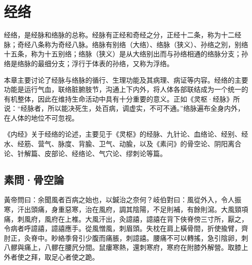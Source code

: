 \documentclass[12pt]{ctexbook}%
\begin{document}
\pagestyle{main2}
\fi
\chapter{经络}%

经络，是经脉和络脉的总称。经脉有正经和奇经之分，正经十二条，称为十二经脉；奇经八条称为奇经八脉。络脉有别络（大络）、络脉（狭义）、孙络之別，别络十五条，称为十五别络；络脉（狭义）是从大络别出而与孙络相通的络脉分支；孙络是络脉的最细分支；浮行于体表的孙络，又称为浮络。

本章主要讨论了经脉与络脉的循行、生理功能及其病理、病证等内容。经络的主要功能是运行气血，联络脏腑肢节，沟通上下内外，将人体各部联结成为一个统一的有机整体，因此在维持生命活动中具有十分重要的意义。正如《灵枢·经脉》所说：“经脉者，所以能决死生，处百病，调虚实，不可不通。”络脉遍布全身内外，在人体的地位不可忽视。

《内经》关于经络的论述，主要见于《灵枢》的经脉、九针论、血络论、经别、经水、经筋、营气、脉度、背腧、卫气、动腧，以及《素问》的骨空论、阴阳离合论、针解篇、皮部论、经络论、气穴论、缪刺论等篇。

\section{素問·骨空論}%


\begin{yuanwen}
黃帝問曰：余聞風者百病之始也，以鍼治之奈何？岐伯對曰：風從外入，令人振寒，汗出頭痛，身重惡寒，治在風府，調其陰陽，不足則補，有餘則瀉。大風頸項痛，刺風府，風府在上椎。大風汗出，灸譩譆，譩譆在背下俠脊傍三寸所，厭之，令病者呼譩譆，譩譆應手。從風憎風，刺眉頭。失枕在肩上橫骨間，折使揄臂，齊肘正，灸脊中。眇絡季脅引少腹而痛脹，刺譩譆。腰痛不可以轉搖，急引陰卵，刺八髎與痛上，八髎在腰凥分間。鼠瘻寒熱，還刺寒府，寒府在附膝外解營。取膝上外者使之拜，取足心者使之跪。
\end{yuanwen}

\end{document}
